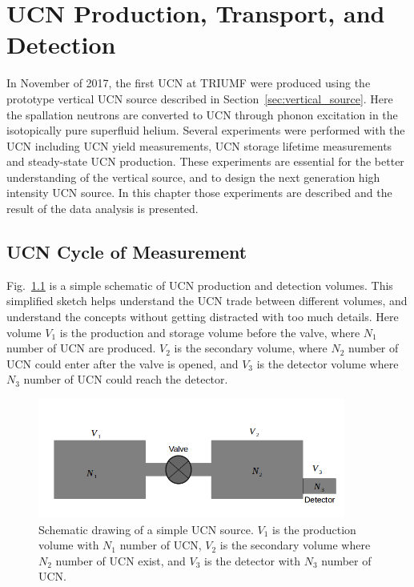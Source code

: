 \chapter{UCN Production, Transport, and Detection\label{chap:UCNresult}}

In November of 2017, the first UCN at TRIUMF were produced using the
prototype vertical UCN source described in
Section~\ref{sec:vertical_source}. Here the spallation neutrons are
converted to UCN through phonon excitation in the isotopically pure
superfluid helium. Several experiments were performed with the UCN
including UCN yield measurements, UCN storage lifetime measurements
and steady-state UCN production. These experiments are essential for
the better understanding of the vertical source, and to design the next
generation high intensity UCN source. In this chapter those
experiments are described and the result of the data analysis is
presented.

\section{UCN Cycle of Measurement}
Fig.~\ref{fig:volume_schematic} is a simple schematic of UCN
production and detection volumes. This simplified sketch helps
understand the UCN trade between different volumes, and understand the
concepts without getting distracted with too much details. Here volume
$V_1$ is the production and storage volume before the valve, where
$N_1$ number of UCN are produced. $V_2$ is the secondary volume, where
$N_2$ number of UCN could enter after the valve is opened, and $V_3$
is the detector volume where $N_3$ number of UCN could reach the
detector.



\begin{figure}[h]
  \centering
  \includegraphics[width=0.9\textwidth]{volume_schematic.png}
  \caption{Schematic drawing of a simple UCN source. $V_1$ is the
    production volume with $N_1$ number of UCN, $V_2$ is the secondary
    volume where $N_2$ number of UCN exist, and $V_3$ is the detector
    with $N_3$ number of UCN. }
  \label{fig:volume_schematic}
\end{figure}

